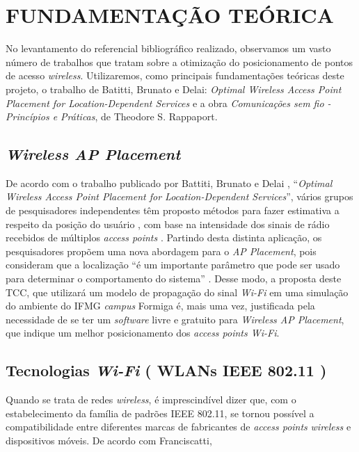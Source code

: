\documentclass[
	12pt,				%
	twoside,			%
	a4paper,			%
	english,			%
	french,				%
	spanish,			%
	brazil				%
	]{abntex2}
\begin{document}
\chapter{FUNDAMENTAÇÃO TEÓRICA}\label{sec:fundamentacao}

No levantamento do referencial bibliográfico realizado, observamos um
vasto número de trabalhos que tratam sobre a otimização do
posicionamento de pontos de acesso \emph{wireless}. Utilizaremos, como
principais fundamentações teóricas deste projeto, o trabalho de Batitti,
Brunato e Delai: \emph{Optimal Wireless Access Point Placement for
Location-Dependent Services} e a obra \emph{Comunicações sem fio -
Princípios e Práticas}, de Theodore S. Rappaport.

\section{\texorpdfstring{\emph{Wireless AP
Placement}}{Wireless AP Placement}}\label{wireless-ap-placement}

De acordo com o trabalho publicado por Battiti, Brunato e Delai
\cite{BATTITI}, ``\emph{Optimal Wireless Access Point Placement for
Location-Dependent Services}'', vários grupos de pesquisadores
independentes têm proposto métodos para fazer estimativa a respeito da
posição do usuário \cite{DALSSOTO}, com base na intensidade dos sinais
de rádio recebidos de múltiplos \emph{access points} \cite{NAJNUDEL}.
Partindo desta distinta aplicação, os pesquisadores propõem uma nova
abordagem para o \emph{AP Placement}, pois consideram que a localização
``é um importante parâmetro que pode ser usado para determinar o
comportamento do sistema'' \cite[p. 1]{BATTITI}. Desse modo, a proposta
deste TCC, que utilizará um modelo de propagação do sinal \emph{Wi-Fi}
em uma simulação do ambiente do IFMG \emph{campus} Formiga é, mais uma
vez, justificada pela necessidade de se ter um \emph{software} livre e
gratuito para \emph{Wireless AP Placement}, que indique um melhor
posicionamento dos \emph{access points Wi-Fi}.

\section{\texorpdfstring{Tecnologias \emph{Wi-Fi} ( WLANs IEEE 802.11
)}{Tecnologias Wi-Fi ( WLANs IEEE 802.11 )}}\label{tecnologias-wi-fi-wlans-ieee-802.11}

Quando se trata de redes \emph{wireless}, é imprescindível dizer que,
com o estabelecimento da família de padrões IEEE 802.11, se tornou
possível a compatibilidade entre diferentes marcas de fabricantes de
\emph{access points} \emph{wireless} e dispositivos móveis. De acordo
com Franciscatti,
\end{document}
